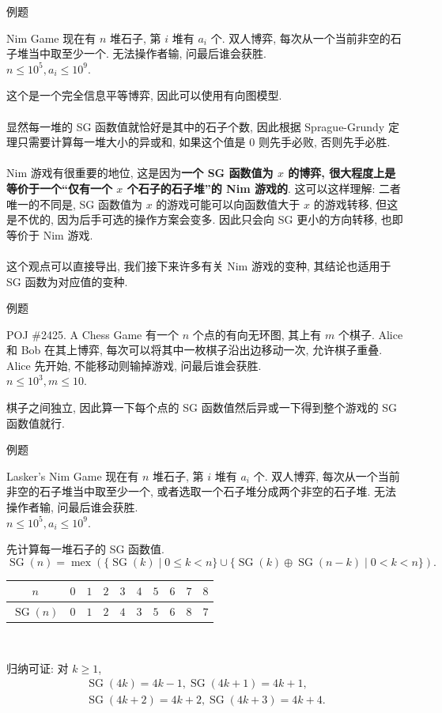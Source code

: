 \documentclass{beamer}
\newcommand{\nl}{\\\hspace*{\fill}\\}
\begin{document}
	\begin{frame}{例题}
		\begin{block}{Nim Game}
			现在有 $n$ 堆石子, 第 $i$ 堆有 $a_i$ 个. 双人博弈, 每次从一个当前非空的石子堆当中取至少一个. 无法操作者输, 问最后谁会获胜.\\
			$n\leq 10^5,a_i\leq 10^9$.
		\end{block}
		\pause
		这个是一个完全信息平等博弈, 因此可以使用有向图模型.\nl
		显然每一堆的 SG 函数值就恰好是其中的石子个数, 因此根据 Sprague-Grundy 定理只需要计算每一堆大小的异或和, 如果这个值是 $0$ 则先手必败, 否则先手必胜.\nl
		\pause
		Nim 游戏有很重要的地位, 这是因为\textbf{一个 SG 函数值为 $x$ 的博弈, 很大程度上是等价于一个``仅有一个 $x$ 个石子的石子堆''的 Nim 游戏的}. 这可以这样理解: 二者唯一的不同是, SG 函数值为 $x$ 的游戏可能可以向函数值大于 $x$ 的游戏转移, 但这是不优的, 因为后手可选的操作方案会变多. 因此只会向 SG 更小的方向转移, 也即等价于 Nim 游戏.\nl
		这个观点可以直接导出, 我们接下来许多有关 Nim 游戏的变种, 其结论也适用于 SG 函数为对应值的变种.
	\end{frame}

	\begin{frame}{例题}
		\begin{block}{POJ \#2425. A Chess Game}
			有一个 $n$ 个点的有向无环图, 其上有 $m$ 个棋子. Alice 和 Bob 在其上博弈, 每次可以将其中一枚棋子沿出边移动一次, 允许棋子重叠. Alice 先开始, 不能移动则输掉游戏, 问最后谁会获胜.\\
			$n\leq 10^3,m\leq 10$.
		\end{block}
		\pause
		棋子之间独立, 因此算一下每个点的 SG 函数值然后异或一下得到整个游戏的 SG 函数值就行.
	\end{frame}

	\begin{frame}{例题}
		\begin{block}{Lasker's Nim Game}
			现在有 $n$ 堆石子, 第 $i$ 堆有 $a_i$ 个. 双人博弈, 每次从一个当前非空的石子堆当中取至少一个, 或者选取一个石子堆分成两个非空的石子堆. 无法操作者输, 问最后谁会获胜.\\
			$n\leq 10^5,a_i\leq 10^9$.
		\end{block}
		\pause
		先计算每一堆石子的 SG 函数值.
		$$
		\operatorname{SG}(n)=\operatorname{mex}(\{\operatorname{SG}(k)\mid 0\leq k<n\}\cup\{\operatorname{SG}(k)\oplus\operatorname{SG}(n-k)\mid 0<k<n\}).
		$$
		\begin{center}
			\begin{tabular}{cccccccccc}
				\toprule
				                   $n$ & $0$ & $1$ & $2$ & $3$ & $4$ & $5$ & $6$ & $7$ & $8$\\
				\hline
				$\operatorname{SG}(n)$ & $0$ & $1$ & $2$ & $4$ & $3$ & $5$ & $6$ & $8$ & $7$\\
				\bottomrule
			\end{tabular}\\
		\end{center}
		归纳可证: 对 $k\geq 1$,
		\begin{align*}
			\operatorname{SG}(4k)=4k-1,\operatorname{SG}(4k+1)=4k+1,\\
			\operatorname{SG}(4k+2)=4k+2,\operatorname{SG}(4k+3)=4k+4.
		\end{align*}
	\end{frame}
\end{document}
